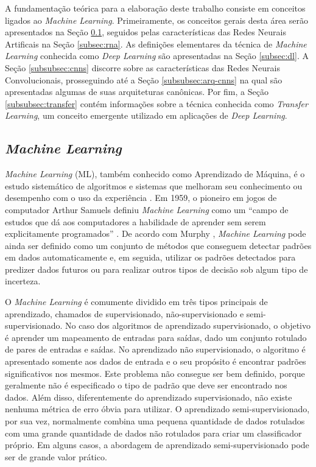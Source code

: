 A fundamentação teórica para a elaboração deste trabalho consiste em conceitos ligados ao \emph{Machine Learning}. Primeiramente, os conceitos gerais desta área serão apresentados na Seção \ref{subsec:ml}, seguidos pelas características das Redes Neurais Artificais na Seção \ref{subsec:rna}. As definições elementares da técnica de \emph{Machine Learning} conhecida como \emph{Deep Learning} são apresentadas na Seção \ref{subsec:dl}. A Seção \ref{subsubsec:cnns} discorre sobre as características das Redes Neurais Convolucionais, prosseguindo até a Seção \ref{subsubsec:arq-cnns} na qual são apresentadas algumas de suas arquiteturas canônicas. Por fim, a Seção \ref{subsubsec:transfer} contém informações sobre a técnica conhecida como \emph{Transfer Learning}, um conceito emergente utilizado em aplicações de \emph{Deep Learning}.


\subsection{\emph{Machine Learning}}
\label{subsec:ml}

\emph{Machine Learning} (ML), também conhecido como Aprendizado de Máquina, é o estudo sistemático de algoritmos e sistemas que melhoram seu conhecimento ou desempenho com o uso da experiência \cite{flach}. Em 1959, o pioneiro em jogos de computador Arthur Samuels definiu \emph{Machine Learning} como um ``campo de estudos que dá aos computadores a habilidade de aprender sem serem explicitamente programados'' \cite{simon}. De acordo com Murphy \cite{murphy} , \emph{Machine Learning} pode ainda ser definido como um conjunto de métodos que conseguem detectar padrões em dados automaticamente e, em seguida, utilizar os padrões detectados para predizer dados futuros ou para realizar outros tipos de decisão sob algum tipo de incerteza.

O \emph{Machine Learning} é comumente dividido em três tipos principais de aprendizado, chamados de supervisionado, não-supervisionado e semi-supervisionado. No caso dos algoritmos de aprendizado supervisionado, o objetivo é aprender um mapeamento de entradas para saídas, dado um conjunto rotulado de pares de entradas e saídas. No aprendizado não supervisionado, o algoritmo é apresentado somente aos dados de entrada e o seu propósito é encontrar padrões significativos nos mesmos. Este problema não consegue ser bem definido, porque geralmente não é especificado o tipo de padrão que deve ser encontrado nos dados. Além disso, diferentemente do aprendizado supervisionado, não existe nenhuma métrica de erro óbvia para utilizar. O aprendizado semi-supervisionado, por sua vez, normalmente combina uma pequena quantidade de dados rotulados com uma grande quantidade de dados não rotulados para criar um classificador próprio. Em alguns casos, a abordagem de aprendizado semi-supervisionado pode ser de grande valor prático. \cite{khan}

